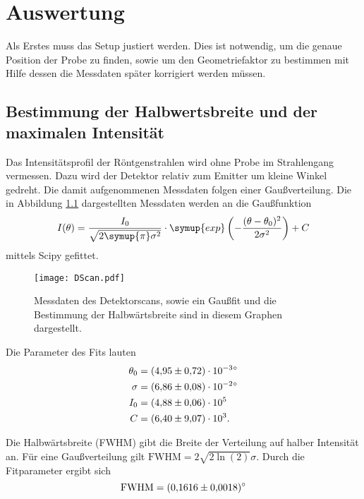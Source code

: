\chapter{Auswertung}
\label{cha:Auswertung}
Als Erstes muss das Setup justiert werden. Dies ist notwendig, um die genaue Position der Probe zu finden, sowie um den Geometriefaktor zu bestimmen mit Hilfe dessen die Messdaten 
später korrigiert werden müssen.

\section{Bestimmung der Halbwertsbreite und der maximalen Intensität}
\label{sec:FWHM}
Das Intensitätsprofil der Röntgenstrahlen wird ohne Probe im Strahlengang vermessen. Dazu wird der Detektor relativ zum Emitter um kleine Winkel gedreht. Die damit aufgenommenen 
Messdaten folgen einer Gaußverteilung. Die in Abbildung \ref{fig:DScan} dargestellten Messdaten werden an die Gaußfunktion 
\begin{equation*}
    I(\theta) = \frac{I_0}{\sqrt{2\symup{\pi}\sigma^2}}\cdot \symup{exp}\left(-\frac{(\theta - \theta_0)^2}{2\sigma^2}\right) + C
\end{equation*}
mittels Scipy \cite{scipy} gefittet.

\begin{figure}
    \centering
    \texttt{[image: DScan.pdf]}
    \caption{Messdaten des Detektorscans, sowie ein Gaußfit und die Bestimmung der Halbwärtsbreite sind in diesem Graphen dargestellt.}
    \label{fig:DScan}
  \end{figure}

Die Parameter des Fits lauten
\begin{align*}
    \theta_0 &= \qty{4.95 +-0.72e-3}{\degree} \\
    \sigma &= \qty{6.86 +- 0.08e-2}{\degree} \\
    I_0 &= \num{4.88 +- 0.06e5} \\
    C &= \num{6.40 +- 9.07e3}.
\end{align*}

Die Halbwärtsbreite (FWHM) gibt die Breite der Verteilung auf halber Intensität an. Für eine Gaußverteilung gilt $\text{FWHM} = 2\sqrt{2\ln\left(2\right)}\sigma$. Durch die 
Fitparameter ergibt sich 
\begin{equation*}
    \text{FWHM} = \qty{0.1616+-0.0018}{\degree}
\end{equation*}

